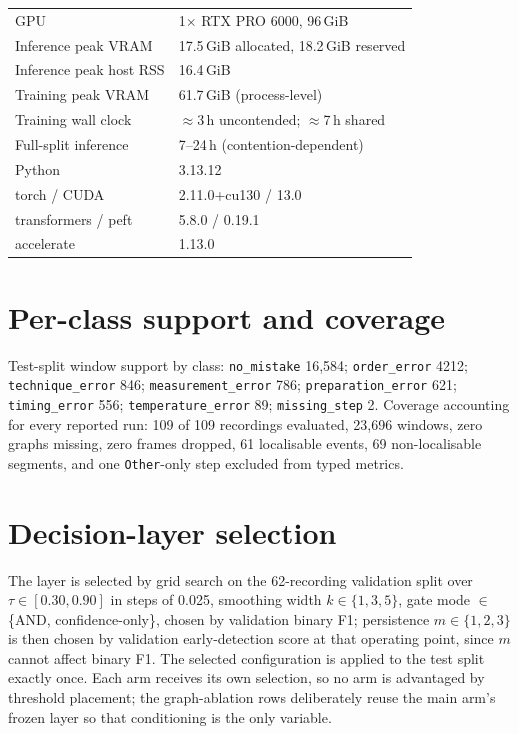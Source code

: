 \documentclass[10pt,twocolumn]{article}
\begin{document}
\begin{center}
\begin{tabular}{@{}l@{\hspace{5pt}}p{}@{}}
\midrule
GPU & 1$\times$ RTX PRO 6000, 96\,GiB \\
Inference peak VRAM & 17.5\,GiB allocated, 18.2\,GiB reserved \\
Inference peak host RSS & 16.4\,GiB \\
Training peak VRAM & 61.7\,GiB (process-level) \\
Training wall clock & $\approx$3\,h uncontended; $\approx$7\,h shared \\
Full-split inference & 7--24\,h (contention-dependent) \\
\midrule
Python & 3.13.12 \\
torch / CUDA & 2.11.0+cu130 / 13.0 \\
transformers / peft & 5.8.0 / 0.19.1 \\
accelerate & 1.13.0 \\
\bottomrule
\end{tabular}
\end{center}

\section{Per-class support and coverage}
\label{app:coverage}

Test-split window support by class: \texttt{no\_mistake} 16{,}584;
\texttt{order\_error} 4212; \texttt{technique\_error} 846;
\texttt{measurement\_error} 786; \texttt{preparation\_error} 621;
\texttt{timing\_error} 556; \texttt{temperature\_error} 89;
\texttt{missing\_step} 2. Coverage accounting for every reported run: 109 of 109
recordings evaluated, 23{,}696 windows, zero graphs missing, zero frames
dropped, 61 localisable events, 69 non-localisable segments, and one
\texttt{Other}-only step excluded from typed metrics.

\section{Decision-layer selection}
\label{app:decision}

The layer is selected by grid search on the 62-recording validation split over
$\tau \in [0.30, 0.90]$ in steps of 0.025, smoothing width $k \in \{1,3,5\}$,
gate mode $\in$ \{AND, confidence-only\}, chosen by validation binary F1;
persistence $m \in \{1,2,3\}$ is then chosen by validation early-detection score
at that operating point, since $m$ cannot affect binary F1. The selected
configuration is applied to the test split exactly once. Each arm receives its
own selection, so no arm is advantaged by threshold placement; the graph-ablation
rows deliberately reuse the main arm's frozen layer so that conditioning is the
only variable.
\end{document}
